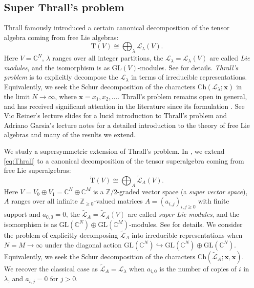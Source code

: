 \documentclass[11pt]{article}
\theoremstyle{definition}
\numberwithin{equation}{section}
\newcommand\CC{\mathbb{C}}
\newcommand\ZZ{\mathbb{Z}}
\newcommand\ch{\Ch}
\newcommand\GL{\mathrm{GL}}
\newcommand\Trm{\mathrm{T}}
\newcommand\xb{\mathbf{x}}
\newcommand\Lcal{\mathcal{L}}
\newcommand\Ltil{\widetilde{\mathcal{L}}}
\newcommand\Trmtil{\widetilde{\Trm}}
\newcommand\Ch{\mathrm{Ch}}
\begin{document}
\subsection{Super Thrall's problem}
Thrall \cite{Thrall} famously introduced a certain canonical decomposition of the tensor algebra coming from free Lie algebras:
\begin{equation}\label{eq:Thrall}
    \Trm(V) \cong \bigoplus_\lambda \Lcal_\lambda(V).
\end{equation}
Here $V = \CC^N$, $\lambda$ ranges over all integer partitions, the $\Lcal_\lambda = \Lcal_\lambda(V)$ are called \textit{Lie modules}, and the isomorphism is as $\GL(V)$-modules. See  for details. \textit{Thrall's problem} is to explicitly decompose the $\Lcal_\lambda$ in terms of irreducible representations. Equivalently, we seek the Schur decomposition of the characters $\ch(\Lcal_\lambda; \xb)$ in the limit $N \to \infty$, where $\xb = x_1, x_2, \ldots$. Thrall's problem remains open in general, and has received significant attention in the literature since its formulation \cite{AS,BBG,Brandt,Gar,GR,Kly,KW,Sch,Sun}. See Vic Reiner's lecture slides \cite{Rei} for a lucid introduction to Thrall's problem and Adriano Garsia's lecture notes \cite{Gar} for a detailed introduction to the theory of free Lie algebras and many of the results we extend.

We study a supersymmetric extension of Thrall's problem. In , we extend \eqref{eq:Thrall} to a canonical decomposition of the tensor superalgebra coming from free Lie superalgebras:
\begin{equation}\label{eq:super-Thrall}
    \Trmtil(V) \cong \bigoplus_A \widetilde{\Lcal}_A(V).
\end{equation}
Here $V = V_0 \oplus V_1 = \CC^N \oplus \CC^M$ is a $\ZZ/2$-graded vector space (a \textit{super vector space}), $A$ ranges over all infinite $\ZZ_{\geq 0}$-valued matrices $A=(a_{i,j})_{i,j \geq 0}$ with finite support and $a_{0,0}=0$, the $\Ltil_A = \Ltil_A(V)$ are called \textit{super Lie modules}, and the isomorphism is as $\GL(\CC^N) \oplus \GL(\CC^M)$-modules. See  for details. We consider the problem of explicitly decomposing $\Ltil_A$ into irreducible representations when $N=M \to \infty$ under the diagonal action $\GL(\CC^N) \hookrightarrow \GL(\CC^N) \oplus \GL(\CC^N)$. Equivalently, we seek the Schur decomposition of the characters $\ch(\Ltil_A; \xb, \xb)$. We recover the classical case as $\Ltil_A = \Lcal_\lambda$ when $a_{i,0}$ is the number of copies of $i$ in $\lambda$, and $a_{i,j} = 0$ for $j > 0$.
\end{document}
